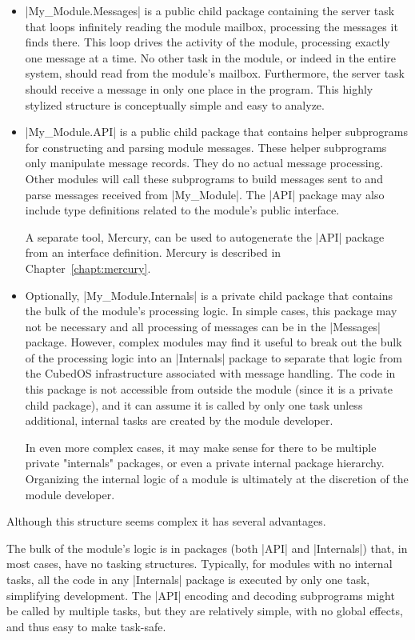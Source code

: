 \begin{itemize}
\item |My_Module.Messages| is a public child package containing the server task that loops
infinitely reading the module mailbox, processing the messages it finds there. This loop drives
the activity of the module, processing exactly one message at a time. No other task in the
module, or indeed in the entire system, should read from the module's mailbox. Furthermore, the
server task should receive a message in only one place in the program. This highly stylized
structure is conceptually simple and easy to analyze.

\item |My_Module.API| is a public child package that contains helper subprograms for
constructing and parsing module messages. These helper subprograms only manipulate message
records. They do no actual message processing. Other modules will call these subprograms to
build messages sent to and parse messages received from |My_Module|. The |API| package may also
include type definitions related to the module's public interface.

A separate tool, Mercury, can be used to autogenerate the |API| package from an interface
definition. Mercury is described in Chapter~\ref{chapt:mercury}.

\item Optionally, |My_Module.Internals| is a private child package that contains the bulk of the
module's processing logic. In simple cases, this package may not be necessary and all processing
of messages can be in the |Messages| package. However, complex modules may find it useful to
break out the bulk of the processing logic into an |Internals| package to separate that logic
from the CubedOS infrastructure associated with message handling. The code in this package is
not accessible from outside the module (since it is a private child package), and it can assume
it is called by only one task unless additional, internal tasks are created by the module
developer.

In even more complex cases, it may make sense for there to be multiple private "internals"
packages, or even a private internal package hierarchy. Organizing the internal logic of a
module is ultimately at the discretion of the module developer.
\end{itemize}

Although this structure seems complex it has several advantages.

The bulk of the module's logic is in packages (both |API| and |Internals|) that, in most cases,
have no tasking structures. Typically, for modules with no internal tasks, all the code in any
|Internals| package is executed by only one task, simplifying development. The |API| encoding
and decoding subprograms might be called by multiple tasks, but they are relatively simple, with
no global effects, and thus easy to make task-safe.

